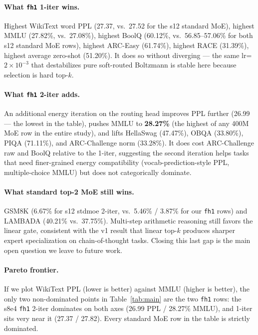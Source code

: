 \documentclass[oneside]{article}
\begin{document}
\paragraph{What \texttt{fh1} 1-iter wins.} Highest WikiText word PPL (27.37, vs.\ 27.52 for the s12 standard MoE), highest MMLU (27.82\%, vs.\ 27.08\%), highest BoolQ (60.12\%, vs.\ 56.85--57.06\% for both s12 standard MoE rows), highest ARC-Easy (61.74\%), highest RACE (31.39\%), highest average zero-shot (51.20\%). It does so without diverging --- the same lr=$2\times 10^{-3}$ that destabilizes pure soft-routed Boltzmann is stable here because selection is hard top-$k$.

\paragraph{What \texttt{fh1} 2-iter adds.} An additional energy iteration on the routing head improves PPL further (26.99 --- the lowest in the table), pushes MMLU to \textbf{28.27\%} (the highest of any 400M MoE row in the entire study), and lifts HellaSwag (47.47\%), OBQA (33.80\%), PIQA (71.11\%), and ARC-Challenge norm (33.28\%). It does cost ARC-Challenge raw and BoolQ relative to the 1-iter, suggesting the second iteration helps tasks that need finer-grained energy compatibility (vocab-prediction-style PPL, multiple-choice MMLU) but does not categorically dominate.

\paragraph{What standard top-2 MoE still wins.} GSM8K (6.67\% for s12 stdmoe 2-iter, vs.\ 5.46\% / 3.87\% for our \texttt{fh1} rows) and LAMBADA (40.21\% vs.\ 37.75\%). Multi-step arithmetic reasoning still favors the linear gate, consistent with the v1 result that linear top-$k$ produces sharper expert specialization on chain-of-thought tasks. Closing this last gap is the main open question we leave to future work.

\paragraph{Pareto frontier.} If we plot WikiText PPL (lower is better) against MMLU (higher is better), the only two non-dominated points in Table~\ref{tab:main} are the two \texttt{fh1} rows: the s8e4 \texttt{fh1} 2-iter dominates on both axes (26.99 PPL / 28.27\% MMLU), and 1-iter sits very near it (27.37 / 27.82). Every standard MoE row in the table is strictly dominated.
\end{document}
